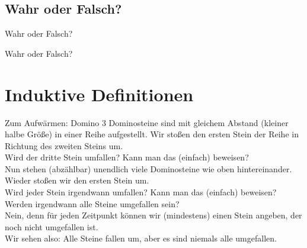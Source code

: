





\graphicspath{{../figures/}}



\framePrevEpisode

\subsection{Wahr oder Falsch?}
\begin{frame}
	\begin{block}{Wahr oder Falsch?}
	\end{block}
\end{frame}

\begin{frame}
	\begin{block}{Wahr oder Falsch?}
	\end{block}
\end{frame}

\section{Induktive Definitionen}

\begin{frame}{Zum Aufwärmen: Domino}
	3 Dominosteine sind mit gleichem Abstand (kleiner halbe Größe) in einer Reihe aufgestellt. Wir stoßen den ersten Stein der Reihe in Richtung des zweiten Steins um. \\
	Wird der dritte Stein umfallen? Kann man das (einfach) beweisen? \\[1em]
	\pause
	Nun stehen (abzählbar) unendlich viele Dominosteine wie oben hintereinander. Wieder stoßen wir den ersten Stein um. \\
	Wird jeder Stein irgendwann umfallen? Kann man das (einfach) beweisen? \\[1em]
	\pause
	Werden irgendwann alle Steine umgefallen sein? \\
	\pause Nein, denn für jeden Zeitpunkt können wir (mindestens) einen Stein angeben, der noch nicht umgefallen ist.\\
	Wir sehen also: Alle Steine fallen um, aber es sind niemals alle umgefallen.
\end{frame}

